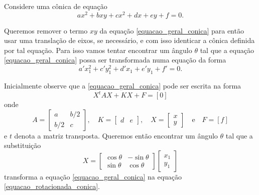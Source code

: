 Considere uma cônica de equação
\begin{equation}\label{equacao_geral_conica}
  ax^2 + bxy + cx^2 + dx + ey + f = 0.
\end{equation}

Queremos remover o termo $xy$ da equação \eqref{equacao_geral_conica} para então usar uma translação de eixos, se necessário, e com isso identicar a cônica definida por tal equação. Para isso vamos tentar encontrar um ângulo $\theta$ tal que a equação \eqref{equacao_geral_conica} possa ser transformada numa equação da forma
\begin{equation}\label{equacao_rotacionada_conica}
  a'x_1^2 + c'y_1^2 + d'x_1 + e'y_1 + f' = 0.
\end{equation}

Inicialmente observe que a \eqref{equacao_geral_conica} pode ser escrita na forma
\begin{equation}\label{equacao_matricial_conica}
  X^tAX + KX + F = [0]
\end{equation}
onde
\[
  A = \begin{bmatrix}
    a & b/2\\
    b/2 & c
  \end{bmatrix}
, \quad K = \begin{bmatrix}
  d & e
\end{bmatrix}, \quad X = \begin{bmatrix}
  x\\
  y
\end{bmatrix}\quad\mbox{e}\quad F = [f]
\]
e $t$ denota a matriz transposta. Queremos então encontrar um ângulo $\theta$ tal que a substituição
\begin{equation}\label{substituicao_rotacao_eixos}
  X = \begin{bmatrix}
    \cos\theta & -\sin\theta\\
    \sin\theta & \cos\theta
  \end{bmatrix}\begin{bmatrix}
    x_1\\y_1
  \end{bmatrix}
\end{equation}
transforma a equação \eqref{equacao_geral_conica} na equação \eqref{equacao_rotacionada_conica}.

